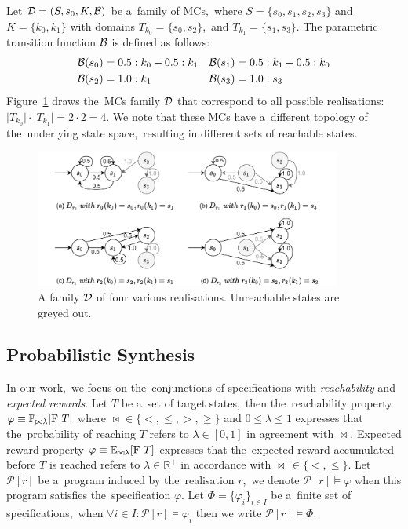\begin{example}\label{exam:mcfamily}
Let $\mathcal{D} = (S,s_{0},K,\mathcal{B})$ be a~family of MCs,~where $S = \{s_0, s_1, s_2, s_3\}$ and $K = \{ k_0, k_1\}$ with domains $T_{k_0} = \{s_0, s_2\}$,~and $T_{k_1} = \{s_1, s_3\}$.
The parametric transition function $\mathcal{B}$ is defined as follows:
\begin{align*}
    \mathcal{B}(s_0) &= 0.5 : k_0 + 0.5 : k_1  &  \mathcal{B}(s_1)  &= 0.5 : k_1  + 0.5 : k_0 \\
    \mathcal{B}(s_2) &= 1.0: k_1   &  \mathcal{B}(s_3)  &= 1.0 : s_3
\end{align*}
Figure~\ref{fig:mcfamily} draws the~MCs family $\mathcal{D}$ that correspond to all possible realisations: $\lvert T_{k_0} \rvert \cdot \lvert T_{k_1} \rvert = 2 \cdot 2 = 4$.
We note that these MCs have a~different topology of the~underlying state space,~resulting in different sets of reachable states.
\end{example}

\begin{figure}[ht!]
\centering
\includegraphics[width=0.9\textwidth]{figures/MCFamily.pdf}
\caption{A family $\mathcal{D}$ of four various realisations. Unreachable states are greyed out.}%
\label{fig:mcfamily}%
\end{figure}

\subsection{Probabilistic Synthesis}

\begin{definition}[Specification]
In our work,~we focus on the~conjunctions of specifications with \textit{reachability} and \textit{expected rewards}.
Let $T$ be a~set of target states,~then the~reachability property $\varphi \equiv \mathbb{P}_{\bowtie \lambda}[\mathrm{F}\ T]$ where $\bowtie \in \{<, \leq, >, \geq\}$ and $0 \leq \lambda \leq 1$ expresses that the~probability of reaching $T$ refers to $\lambda \in [0,1]$ in agreement with $\bowtie$.
Expected reward property $\varphi \equiv \mathbb{E}_{\bowtie \lambda}[\mathrm{F}\ T]$ expresses that the~expected reward accumulated before $T$ is reached refers to $\lambda \in \mathbb{R}^+$ in accordance with $\bowtie \, \in \{<, \leq \}$.
Let $\mathcal{P}[r]$ be a~program induced by the~realisation $r$,~we denote $\mathcal{P}[r] \models \varphi$ when this program satisfies the~specification $\varphi$.
Let $\Phi = \{ \varphi_i \}_{i \in I}$ be a~finite set of specifications,~when $\forall i \in I: \mathcal{P}[r] \models \varphi_i$ then we write $\mathcal{P}[r] \models \Phi$.
\end{definition}

